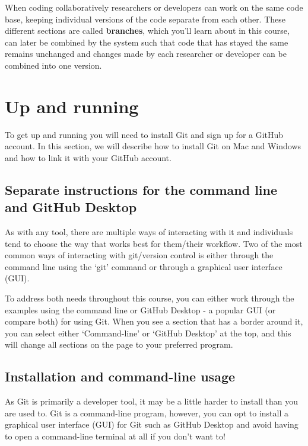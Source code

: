 \documentclass[
  letterpaper,
  DIV=11,
  numbers=noendperiod]{scrartcl}
\begin{document}
When coding collaboratively researchers or developers can work on the
same code base, keeping individual versions of the code separate from
each other. These different sections are called \textbf{branches}, which
you'll learn about in this course, can later be combined by the system
such that code that has stayed the same remains unchanged and changes
made by each researcher or developer can be combined into one version.

\section{Up and running}\label{up-and-running}

To get up and running you will need to install Git and sign up for a
GitHub account. In this section, we will describe how to install Git on
Mac and Windows and how to link it with your GitHub account.

\subsection{Separate instructions for the command line and GitHub
Desktop}\label{separate-instructions-for-the-command-line-and-github-desktop}

As with any tool, there are multiple ways of interacting with it and
individuals tend to choose the way that works best for them/their
workflow. Two of the most common ways of interacting with git/version
control is either through the command line using the `git' command or
through a graphical user interface (GUI).

To address both needs throughout this course, you can either work
through the examples using the command line or GitHub Desktop - a
popular GUI (or compare both) for using Git. When you see a section that
has a border around it, you can select either `Command-line' or `GitHub
Desktop' at the top, and this will change all sections on the page to
your preferred program.

\subsection{Installation and command-line
usage}\label{installation-and-command-line-usage}

As Git is primarily a developer tool, it may be a little harder to
install than you are used to. Git is a command-line program, however,
you can opt to install a graphical user interface (GUI) for Git such as
GitHub Desktop and avoid having to open a command-line terminal at all
if you don't want to!
\end{document}
